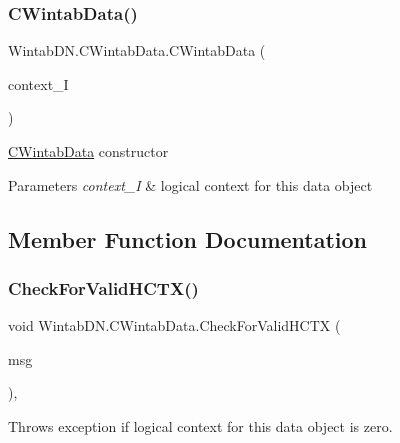 \subsubsection{\texorpdfstring{C\+Wintab\+Data()}{CWintabData()}}
{\footnotesize\ttfamily Wintab\+D\+N.\+C\+Wintab\+Data.\+C\+Wintab\+Data (\begin{DoxyParamCaption}\item[{\mbox{\hyperlink{class_wintab_d_n_1_1_c_wintab_context}{C\+Wintab\+Context}}}]{context\+\_\+I }\end{DoxyParamCaption})\hspace{0.3cm}{\ttfamily [inline]}}



\mbox{\hyperlink{class_wintab_d_n_1_1_c_wintab_data}{C\+Wintab\+Data}} constructor 


\begin{DoxyParams}{Parameters}
{\em context\+\_\+I} & logical context for this data object\\
\hline
\end{DoxyParams}


\subsection{Member Function Documentation}
\mbox{\label{class_wintab_d_n_1_1_c_wintab_data_a7f1321790e92a09e50871a565ee318f6}} 
\subsubsection{\texorpdfstring{Check\+For\+Valid\+H\+C\+T\+X()}{CheckForValidHCTX()}}
{\footnotesize\ttfamily void Wintab\+D\+N.\+C\+Wintab\+Data.\+Check\+For\+Valid\+H\+C\+TX (\begin{DoxyParamCaption}\item[{string}]{msg }\end{DoxyParamCaption})\hspace{0.3cm}{\ttfamily [inline]}, {\ttfamily [private]}}



Throws exception if logical context for this data object is zero. 

\mbox{\label{class_wintab_d_n_1_1_c_wintab_data_ae571e727ce74aa3a5f22a832f242085b}} 
